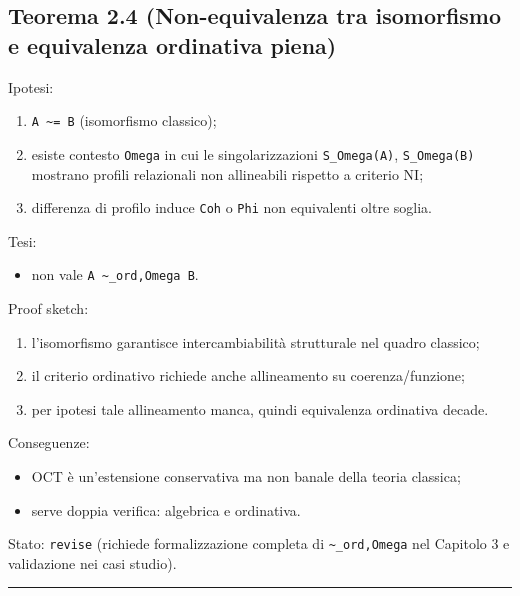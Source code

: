 \subsection{Teorema 2.4 (Non-equivalenza tra isomorfismo e equivalenza ordinativa piena)}

Ipotesi:

\begin{enumerate}
\def\labelenumi{\arabic{enumi}.}
\tightlist
\item
  \texttt{A\ \textasciitilde{}=\ B} (isomorfismo classico);
\item
  esiste contesto \texttt{Omega} in cui le singolarizzazioni \texttt{S\_Omega(A)}, \texttt{S\_Omega(B)} mostrano profili relazionali non allineabili rispetto a criterio NI;
\item
  differenza di profilo induce \texttt{Coh} o \texttt{Phi} non equivalenti oltre soglia.
\end{enumerate}

Tesi:

\begin{itemize}
\tightlist
\item
  non vale \texttt{A\ \textasciitilde{}\_ord,Omega\ B}.
\end{itemize}

Proof sketch:

\begin{enumerate}
\def\labelenumi{\arabic{enumi}.}
\tightlist
\item
  l'isomorfismo garantisce intercambiabilità strutturale nel quadro classico;
\item
  il criterio ordinativo richiede anche allineamento su coerenza/funzione;
\item
  per ipotesi tale allineamento manca, quindi equivalenza ordinativa decade.
\end{enumerate}

Conseguenze:

\begin{itemize}
\tightlist
\item
  OCT è un'estensione conservativa ma non banale della teoria classica;
\item
  serve doppia verifica: algebrica e ordinativa.
\end{itemize}

Stato: \texttt{revise} (richiede formalizzazione completa di \texttt{\textasciitilde{}\_ord,Omega} nel Capitolo 3 e validazione nei casi studio).

\begin{center}\rule{0.5\linewidth}{0.5pt}\end{center}


